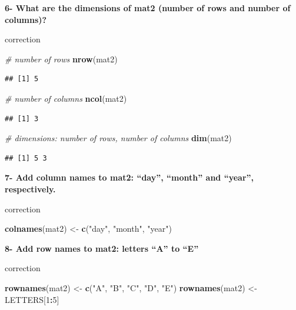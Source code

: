 \documentclass[]{book}
\newenvironment{Shaded}{\begin{snugshade}}{\end{snugshade}}
\newcommand{\CommentTok}[1]{\textcolor[rgb]{0.56,0.35,0.01}{\textit{#1}}}
\newcommand{\DecValTok}[1]{\textcolor[rgb]{0.00,0.00,0.81}{#1}}
\newcommand{\KeywordTok}[1]{\textcolor[rgb]{0.13,0.29,0.53}{\textbf{#1}}}
\newcommand{\NormalTok}[1]{#1}
\newcommand{\OperatorTok}[1]{\textcolor[rgb]{0.81,0.36,0.00}{\textbf{#1}}}
\newcommand{\StringTok}[1]{\textcolor[rgb]{0.31,0.60,0.02}{#1}}
\begin{document}
\textbf{6- What are the dimensions of mat2 (number of rows and number of columns)?}

correction

\begin{Shaded}
\begin{Highlighting}[]
\CommentTok{# number of rows}
\KeywordTok{nrow}\NormalTok{(mat2)}
\end{Highlighting}
\end{Shaded}

\begin{verbatim}
## [1] 5
\end{verbatim}

\begin{Shaded}
\begin{Highlighting}[]
\CommentTok{# number of columns}
\KeywordTok{ncol}\NormalTok{(mat2)}
\end{Highlighting}
\end{Shaded}

\begin{verbatim}
## [1] 3
\end{verbatim}

\begin{Shaded}
\begin{Highlighting}[]
\CommentTok{# dimensions: number of rows, number of columns}
\KeywordTok{dim}\NormalTok{(mat2)}
\end{Highlighting}
\end{Shaded}

\begin{verbatim}
## [1] 5 3
\end{verbatim}

\textbf{7- Add column names to mat2: ``day'', ``month'' and ``year'', respectively.}

correction

\begin{Shaded}
\begin{Highlighting}[]
\KeywordTok{colnames}\NormalTok{(mat2) <-}\StringTok{ }\KeywordTok{c}\NormalTok{(}\StringTok{"day"}\NormalTok{, }\StringTok{"month"}\NormalTok{, }\StringTok{"year"}\NormalTok{)}
\end{Highlighting}
\end{Shaded}

\textbf{8- Add row names to mat2: letters ``A'' to ``E''}

correction

\begin{Shaded}
\begin{Highlighting}[]
\KeywordTok{rownames}\NormalTok{(mat2) <-}\StringTok{ }\KeywordTok{c}\NormalTok{(}\StringTok{"A"}\NormalTok{, }\StringTok{"B"}\NormalTok{, }\StringTok{"C"}\NormalTok{, }\StringTok{"D"}\NormalTok{, }\StringTok{"E"}\NormalTok{)}
\KeywordTok{rownames}\NormalTok{(mat2) <-}\StringTok{ }\NormalTok{LETTERS[}\DecValTok{1}\OperatorTok{:}\DecValTok{5}\NormalTok{]}
\end{Highlighting}
\end{Shaded}
\end{document}
